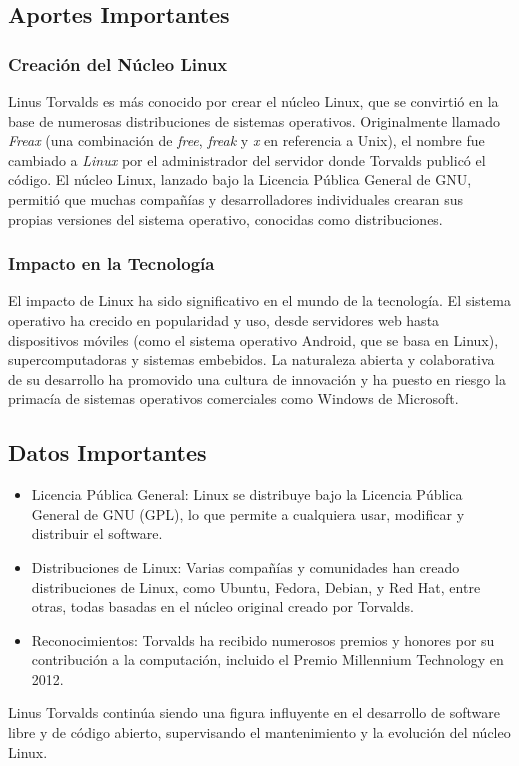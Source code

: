\documentclass[11pt,twoside]{book}
\begin{document}
\subsection*{Aportes Importantes}
\subsubsection*{Creación del Núcleo Linux}
Linus Torvalds es más conocido por crear el núcleo Linux, que se convirtió en la base de numerosas distribuciones de sistemas operativos. Originalmente llamado \textit{Freax} (una combinación de \textit{free}, \textit{freak} y \textit{x} en referencia a Unix), el nombre fue cambiado a \textit{Linux} por el administrador del servidor donde Torvalds publicó el código. El núcleo Linux, lanzado bajo la Licencia Pública General de GNU, permitió que muchas compañías y desarrolladores individuales crearan sus propias versiones del sistema operativo, conocidas como distribuciones.

\subsubsection*{Impacto en la Tecnología}
El impacto de Linux ha sido significativo en el mundo de la tecnología. El sistema operativo ha crecido en popularidad y uso, desde servidores web hasta dispositivos móviles (como el sistema operativo Android, que se basa en Linux), supercomputadoras y sistemas embebidos. La naturaleza abierta y colaborativa de su desarrollo ha promovido una cultura de innovación y ha puesto en riesgo la primacía de sistemas operativos comerciales como Windows de Microsoft.

\subsection*{Datos Importantes}
\begin{itemize}
  \item Licencia Pública General: Linux se distribuye bajo la Licencia Pública General de GNU (GPL), lo que permite a cualquiera usar, modificar y distribuir el software.
  \item Distribuciones de Linux: Varias compañías y comunidades han creado distribuciones de Linux, como Ubuntu, Fedora, Debian, y Red Hat, entre otras, todas basadas en el núcleo original creado por Torvalds.
  \item Reconocimientos: Torvalds ha recibido numerosos premios y honores por su contribución a la computación, incluido el Premio Millennium Technology en 2012.
\end{itemize}
Linus Torvalds continúa siendo una figura influyente en el desarrollo de software libre y de código abierto, supervisando el mantenimiento y la evolución del núcleo Linux.
\end{document}
